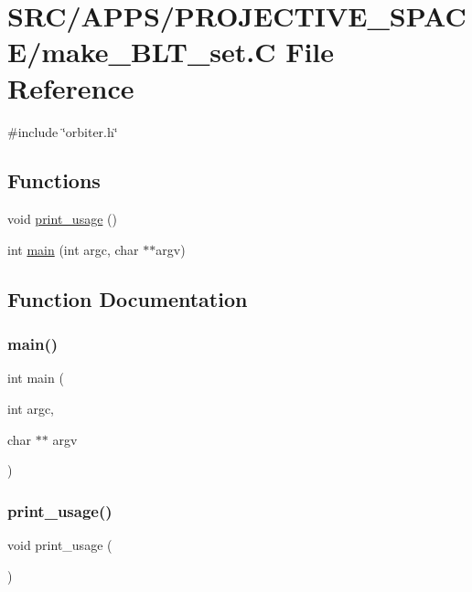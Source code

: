 \hypertarget{make___b_l_t__set_8_c}{}\section{S\+R\+C/\+A\+P\+P\+S/\+P\+R\+O\+J\+E\+C\+T\+I\+V\+E\+\_\+\+S\+P\+A\+C\+E/make\+\_\+\+B\+L\+T\+\_\+set.C File Reference}
\label{make___b_l_t__set_8_c}
{\ttfamily \#include \char`\"{}orbiter.\+h\char`\"{}}\newline
\subsection*{Functions}
\begin{DoxyCompactItemize}
\item 
void \mbox{\hyperlink{make___b_l_t__set_8_c_ae5ad5cbeccaedc03a48d3c7eaa803e79}{print\+\_\+usage}} ()
\item 
int \mbox{\hyperlink{make___b_l_t__set_8_c_a3c04138a5bfe5d72780bb7e82a18e627}{main}} (int argc, char $\ast$$\ast$argv)
\end{DoxyCompactItemize}


\subsection{Function Documentation}
\mbox{\label{make___b_l_t__set_8_c_a3c04138a5bfe5d72780bb7e82a18e627}} 
\subsubsection{\texorpdfstring{main()}{main()}}
{\footnotesize\ttfamily int main (\begin{DoxyParamCaption}\item[{int}]{argc,  }\item[{char $\ast$$\ast$}]{argv }\end{DoxyParamCaption})}

\mbox{\label{make___b_l_t__set_8_c_ae5ad5cbeccaedc03a48d3c7eaa803e79}} 
\subsubsection{\texorpdfstring{print\+\_\+usage()}{print\_usage()}}
{\footnotesize\ttfamily void print\+\_\+usage (\begin{DoxyParamCaption}{ }\end{DoxyParamCaption})}

